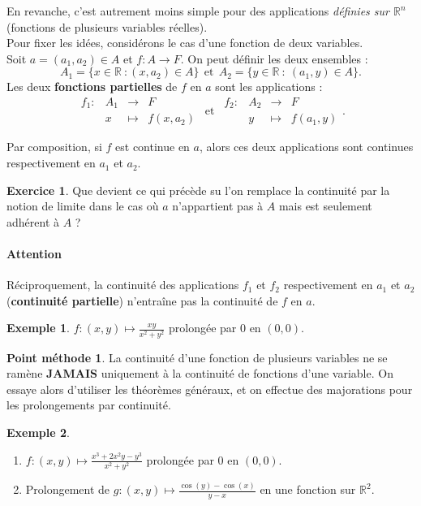 \documentclass[french]{article}
\newcommand{\R}{\mathbb{R}}
\theoremstyle{plain}
\theoremstyle{definition}
\newtheorem*{ex}{Exemple}
\newtheorem*{met}{Point méthode}
\newtheorem{exo}{Exercice}
\theoremstyle{remark}
\begin{document}
En revanche, c'est autrement moins simple pour des applications \textit{définies sur $\R^n$} (fonctions de plusieurs variables réelles). \\
Pour fixer les idées, considérons le cas d'une fonction de deux variables.\\
Soit $a=(a_1,a_2)\in A$ et $f:A\to F$. On peut définir les deux ensembles : $$A_1=\{x\in\R\ : (x,a_2)\in A\}\ \ \text{et}\ \ A_2=\{y\in\R\ : \ (a_1,y)\in A\}.$$
Les deux \textbf{fonctions partielles} de $f$ en $a$ sont les applications : $$\begin{array}{lrcl}
	f_1:&A_1&\longrightarrow&F\\
	&x&\longmapsto&f(x,a_2)
\end{array}\ \ \text{et}\ \ 
\begin{array}{lrcl}
	f_2:&A_2&\longrightarrow&F\\
	&y&\longmapsto&f(a_1,y)
\end{array}.$$

Par composition, si $f$ est continue en $a$, alors ces deux applications sont continues respectivement en $a_1$ et $a_2$.

\begin{exo}
	Que devient ce qui précède su l'on remplace la continuité par la notion de limite dans le cas où $a$ n'appartient pas à $A$ mais est seulement adhérent à $A$ ?
\end{exo}

\paragraph{Attention} Réciproquement, la continuité des applications $f_1$ et $f_2$ respectivement en $a_1$ et $a_2$ (\textbf{continuité partielle}) n'entraîne pas la continuité de $f$ en $a$.

\begin{ex}
	$f:(x,y)\mapsto\displaystyle\frac{xy}{x^2+y^2}$ prolongée par $0$ en $(0,0)$.
\end{ex}

\begin{met}
	La continuité d'une fonction de plusieurs variables ne se ramène \textbf{JAMAIS} uniquement à la continuité de fonctions d'une variable. On essaye alors d'utiliser les théorèmes généraux, et on effectue des majorations pour les prolongements par continuité.
\end{met}

\begin{ex}
	\begin{enumerate}
		\item $f:(x,y)\mapsto\displaystyle\frac{x^3+2x^2y-y^3}{x^2+y^2}$ prolongée par $0$ en $(0,0)$.
		\item Prolongement de $g:(x,y)\mapsto\displaystyle\frac{\cos(y)-\cos(x)}{y-x}$ en une fonction sur $\R^2$. %
	\end{enumerate}
\end{ex}
\end{document}
